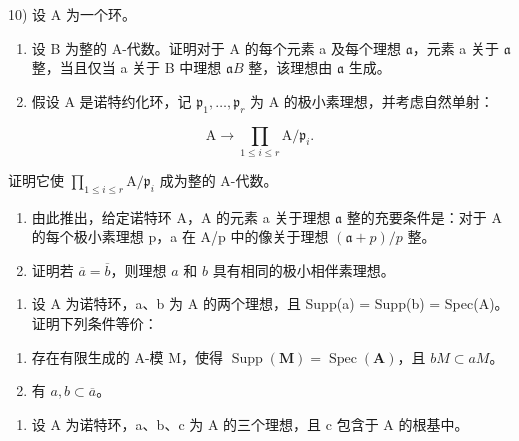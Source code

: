 10) 设 A 为一个环。

\begin{enumerate}
\def\labelenumi{\alph{enumi})}
\item
  设 B 为整的 A-代数。证明对于 A 的每个元素 a 及每个理想 \(\mathfrak{a}\)，元素 a 关于 \(\mathfrak{a}\) 整，当且仅当 a 关于 B 中理想 \(\mathfrak{a}B\) 整，该理想由 \(\mathfrak{a}\) 生成。
\item
  假设 A 是诺特约化环，记 \(\mathfrak{p}_{1},\ldots,\mathfrak{p}_{r}\) 为 A 的极小素理想，并考虑自然单射：
\end{enumerate}

\[
\mathrm{A} \rightarrow \prod_ {1 \leqslant i \leqslant r} \mathrm{A} / \mathfrak {p} _ {i}.
\]

证明它使 \(\prod_{1\leqslant i\leqslant r}\mathrm{A} / \mathfrak{p}_i\) 成为整的 A-代数。

\begin{enumerate}
\def\labelenumi{\alph{enumi})}
\setcounter{enumi}{2}
\item
  由此推出，给定诺特环 A，A 的元素 a 关于理想 \(\mathfrak{a}\) 整的充要条件是：对于 A 的每个极小素理想 p，a 在 A/p 中的像关于理想 \((\mathfrak{a} + p)/p\) 整。
\item
  证明若 \(\overline{a} = \overline{b}\)，则理想 \(a\) 和 \(b\) 具有相同的极小相伴素理想。
\end{enumerate}

\begin{enumerate}
\def\labelenumi{\arabic{enumi})}
\setcounter{enumi}{10}
\tightlist
\item
  设 A 为诺特环，a、b 为 A 的两个理想，且 Supp(a) = Supp(b) = Spec(A)。证明下列条件等价：
\end{enumerate}

\begin{enumerate}
\def\labelenumi{(\roman{enumi})}
\tightlist
\item
  存在有限生成的 A-模 M，使得 \(\operatorname{Supp}(\mathbf{M}) = \operatorname{Spec}(\mathbf{A})\)，且 \(bM \subset aM\)。\\
\item
  有 \(a, b \subset \overline{a}\)。
\end{enumerate}

\begin{enumerate}
\def\labelenumi{\arabic{enumi})}
\setcounter{enumi}{11}
\tightlist
\item
  设 A 为诺特环，a、b、c 为 A 的三个理想，且 c 包含于 A 的根基中。
\end{enumerate}

